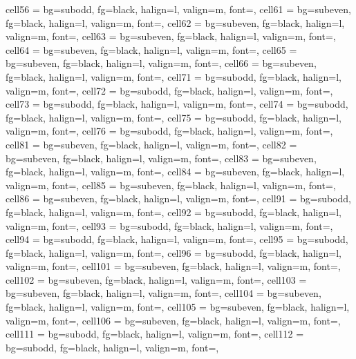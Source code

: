 \documentclass[a4paper,12pt]{article}
\begin{document}
\begin{longtblr}
{  cell{5}{6} = {bg=subodd, fg=black, halign=l, valign=m, font=\footnotesize},
  cell{6}{1} = {bg=subeven, fg=black, halign=l, valign=m, font=\footnotesize},
  cell{6}{2} = {bg=subeven, fg=black, halign=l, valign=m, font=\footnotesize},
  cell{6}{3} = {bg=subeven, fg=black, halign=l, valign=m, font=\footnotesize},
  cell{6}{4} = {bg=subeven, fg=black, halign=l, valign=m, font=\footnotesize},
  cell{6}{5} = {bg=subeven, fg=black, halign=l, valign=m, font=\footnotesize},
  cell{6}{6} = {bg=subeven, fg=black, halign=l, valign=m, font=\footnotesize},
  cell{7}{1} = {bg=subodd, fg=black, halign=l, valign=m, font=\footnotesize},
  cell{7}{2} = {bg=subodd, fg=black, halign=l, valign=m, font=\footnotesize},
  cell{7}{3} = {bg=subodd, fg=black, halign=l, valign=m, font=\footnotesize},
  cell{7}{4} = {bg=subodd, fg=black, halign=l, valign=m, font=\footnotesize},
  cell{7}{5} = {bg=subodd, fg=black, halign=l, valign=m, font=\footnotesize},
  cell{7}{6} = {bg=subodd, fg=black, halign=l, valign=m, font=\footnotesize},
  cell{8}{1} = {bg=subeven, fg=black, halign=l, valign=m, font=\footnotesize},
  cell{8}{2} = {bg=subeven, fg=black, halign=l, valign=m, font=\footnotesize},
  cell{8}{3} = {bg=subeven, fg=black, halign=l, valign=m, font=\footnotesize},
  cell{8}{4} = {bg=subeven, fg=black, halign=l, valign=m, font=\footnotesize},
  cell{8}{5} = {bg=subeven, fg=black, halign=l, valign=m, font=\footnotesize},
  cell{8}{6} = {bg=subeven, fg=black, halign=l, valign=m, font=\footnotesize},
  cell{9}{1} = {bg=subodd, fg=black, halign=l, valign=m, font=\footnotesize},
  cell{9}{2} = {bg=subodd, fg=black, halign=l, valign=m, font=\footnotesize},
  cell{9}{3} = {bg=subodd, fg=black, halign=l, valign=m, font=\footnotesize},
  cell{9}{4} = {bg=subodd, fg=black, halign=l, valign=m, font=\footnotesize},
  cell{9}{5} = {bg=subodd, fg=black, halign=l, valign=m, font=\footnotesize},
  cell{9}{6} = {bg=subodd, fg=black, halign=l, valign=m, font=\footnotesize},
  cell{10}{1} = {bg=subeven, fg=black, halign=l, valign=m, font=\footnotesize},
  cell{10}{2} = {bg=subeven, fg=black, halign=l, valign=m, font=\footnotesize},
  cell{10}{3} = {bg=subeven, fg=black, halign=l, valign=m, font=\footnotesize},
  cell{10}{4} = {bg=subeven, fg=black, halign=l, valign=m, font=\footnotesize},
  cell{10}{5} = {bg=subeven, fg=black, halign=l, valign=m, font=\footnotesize},
  cell{10}{6} = {bg=subeven, fg=black, halign=l, valign=m, font=\footnotesize},
  cell{11}{1} = {bg=subodd, fg=black, halign=l, valign=m, font=\footnotesize},
  cell{11}{2} = {bg=subodd, fg=black, halign=l, valign=m, font=\footnotesize},
}
\end{longtblr}
\end{document}
